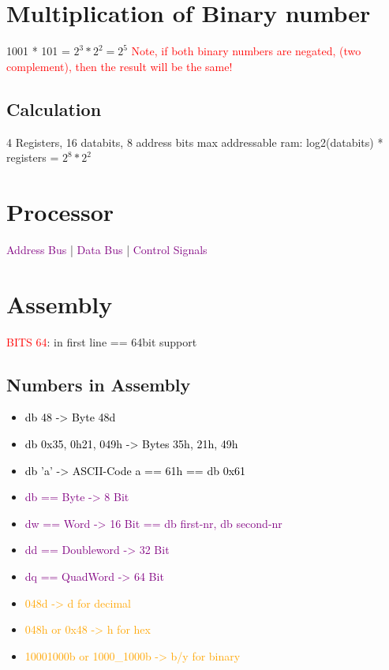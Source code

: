 \documentclass[main.tex,fontsize=7pt,paper=a4,paper=landscape,DIV=calc,]{scrartcl}
\begin{document}
\begin{multicols*}{4}


\section{Multiplication of Binary number}
1001 * 101 = \(2^3 * 2^2 = 2^5\)\newline
\textcolor{red}{Note, if both binary numbers are negated, (two complement), then the result will be the same!}\newline 

\subsection{Calculation}
4 Registers, 16 databits, 8 address bits\newline
max addressable ram: log2(databits) * registers = \(2^8 * 2^2\)\newline

\section{Processor}
\textcolor{purple}{Address Bus} |
\textcolor{purple}{Data Bus} |
\textcolor{purple}{Control Signals}

\section{Assembly}
\textcolor{red}{BITS 64}: in first line == 64bit support

\subsection{Numbers in Assembly}
\begin{itemize}
\item \textcolor{black}{db 48 -> Byte 48d}
\item \textcolor{black}{db 0x35, 0h21, 049h -> Bytes 35h, 21h, 49h}
\item \textcolor{black}{db 'a' -> ASCII-Code a == 61h == db 0x61}
\item \textcolor{purple}{db == Byte -> 8 Bit}
\item \textcolor{purple}{dw == Word -> 16 Bit == db first-nr, db second-nr}
\item \textcolor{purple}{dd == Doubleword -> 32 Bit}
\item \textcolor{purple}{dq == QuadWord -> 64 Bit}
\item \textcolor{orange}{048d -> d for decimal}
\item \textcolor{orange}{048h or 0x48 -> h for hex}
\item \textcolor{orange}{10001000b or 1000\_1000b -> b/y for binary}
\end{itemize}

\end{multicols*}
\end{document}
